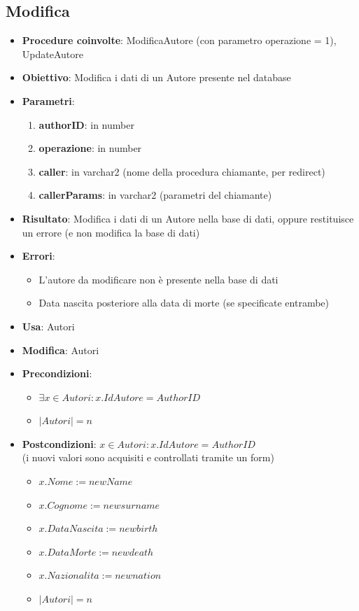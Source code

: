 \subsection{Modifica}
\begin{itemize}
	\item \textbf{Procedure coinvolte}: ModificaAutore (con parametro operazione = 1), UpdateAutore
	\item \textbf{Obiettivo}: Modifica i dati di un Autore presente nel database
	\item \textbf{Parametri}:
	\begin{enumerate}
		\item \textbf{authorID}: in number
		\item \textbf{operazione}: in number
		\item \textbf{caller}: in varchar2 (nome della procedura chiamante, per redirect)
		\item \textbf{callerParams}: in varchar2 (parametri del chiamante)
	\end{enumerate}
	\item \textbf{Risultato}: Modifica i dati di un Autore nella base di dati, oppure restituisce un errore (e non modifica la base di dati)
	\item \textbf{Errori}: 
	\begin{itemize}
		\item L'autore da modificare non è presente nella base di dati
		\item Data nascita posteriore alla data di morte (se specificate entrambe)
	\end{itemize}
	\item \textbf{Usa}: Autori
	\item \textbf{Modifica}: Autori
	\item \textbf{Precondizioni}:
	\begin{itemize}
		\item $\exists x \in Autori : x.IdAutore = AuthorID$
		\item $|Autori| = n$
	\end{itemize}
	\item \textbf{Postcondizioni}: $x \in Autori : x.IdAutore = AuthorID$ \\
	(i nuovi valori sono acquisiti e controllati tramite un form)
	\begin{itemize}
		\item $x.Nome := newName$
		\item $x.Cognome := newsurname$
		\item $x.DataNascita := newbirth$
		\item $x.DataMorte := newdeath$
		\item $x.Nazionalita := newnation$
		\item $|Autori| = n$
	\end{itemize}
\end{itemize}

